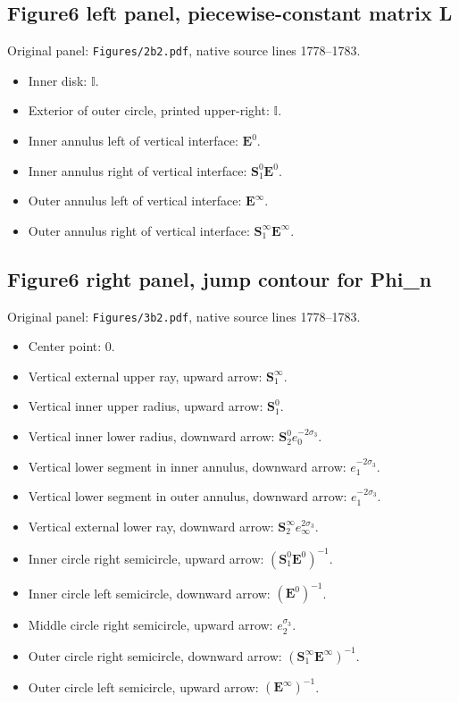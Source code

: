 \subsection*{Figure6 left panel, piecewise-constant matrix L}
\noindent Original panel: \texttt{Figures/2b2.pdf}, native source lines 1778--1783.
\begin{itemize}\itemsep=0pt
\item Inner disk: $\mathbb{I}$.
\item Exterior of outer circle, printed upper-right: $\mathbb{I}$.
\item Inner annulus left of vertical interface: $\mathbf{E}^0{}$.
\item Inner annulus right of vertical interface: $\mathbf{S}_1^0{}\mathbf{E}^0{}$.
\item Outer annulus left of vertical interface: $\mathbf{E}^\infty{}$.
\item Outer annulus right of vertical interface: $\mathbf{S}_1^\infty{}\mathbf{E}^\infty{}$.
\end{itemize}

\subsection*{Figure6 right panel, jump contour for Phi\_n}
\noindent Original panel: \texttt{Figures/3b2.pdf}, native source lines 1778--1783.
\begin{itemize}\itemsep=0pt
\item Center point: $0$.
\item Vertical external upper ray, upward arrow: $\mathbf{S}_1^\infty{}$.
\item Vertical inner upper radius, upward arrow: $\mathbf{S}_1^0{}$.
\item Vertical inner lower radius, downward arrow: $\mathbf{S}_2^0{}e_0^{-2\sigma_3}$.
\item Vertical lower segment in inner annulus, downward arrow: $e_1^{-2\sigma_3}$.
\item Vertical lower segment in outer annulus, downward arrow: $e_1^{-2\sigma_3}$.
\item Vertical external lower ray, downward arrow: $\mathbf{S}_2^\infty{}e_\infty^{2\sigma_3}$.
\item Inner circle right semicircle, upward arrow: $(\mathbf{S}_1^0{}\mathbf{E}^0{})^{-1}$.
\item Inner circle left semicircle, downward arrow: $(\mathbf{E}^0{})^{-1}$.
\item Middle circle right semicircle, upward arrow: $e_2^{\sigma_3}$.
\item Outer circle right semicircle, downward arrow: $(\mathbf{S}_1^\infty{}\mathbf{E}^\infty{})^{-1}$.
\item Outer circle left semicircle, upward arrow: $(\mathbf{E}^\infty{})^{-1}$.
\end{itemize}

